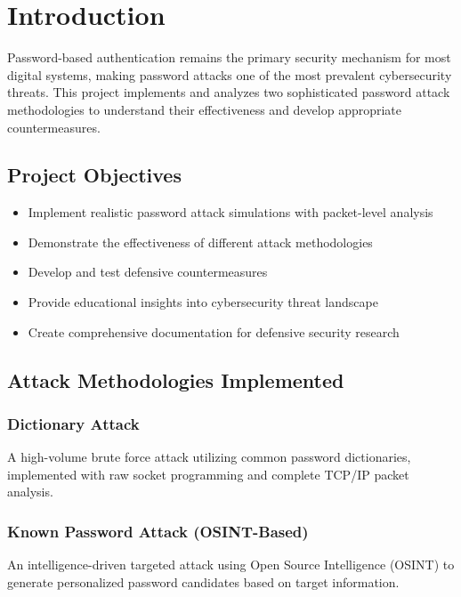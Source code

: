 \documentclass[12pt,a4paper]{article}
\begin{document}
\tableofcontents
\newpage

\section{Introduction}

Password-based authentication remains the primary security mechanism for most digital systems, making password attacks one of the most prevalent cybersecurity threats. This project implements and analyzes two sophisticated password attack methodologies to understand their effectiveness and develop appropriate countermeasures.

\subsection{Project Objectives}

\begin{itemize}
    \item Implement realistic password attack simulations with packet-level analysis
    \item Demonstrate the effectiveness of different attack methodologies
    \item Develop and test defensive countermeasures
    \item Provide educational insights into cybersecurity threat landscape
    \item Create comprehensive documentation for defensive security research
\end{itemize}

\subsection{Attack Methodologies Implemented}

\subsubsection{Dictionary Attack}
A high-volume brute force attack utilizing common password dictionaries, implemented with raw socket programming and complete TCP/IP packet analysis.

\subsubsection{Known Password Attack (OSINT-Based)}
An intelligence-driven targeted attack using Open Source Intelligence (OSINT) to generate personalized password candidates based on target information.
\end{document}
